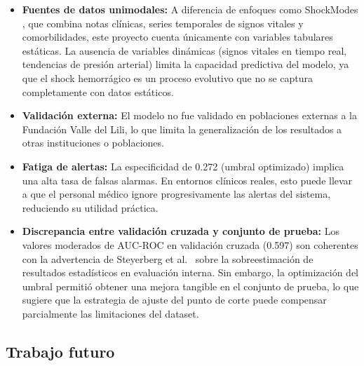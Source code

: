 \documentclass[12pt, letterpaper]{article}
\begin{document}
\begin{itemize}
    \item \textbf{Fuentes de datos unimodales:} A diferencia de enfoques como ShockModes \cite{pal2022}, que combina notas clínicas, series temporales de signos vitales y comorbilidades, este proyecto cuenta únicamente con variables tabulares estáticas. La ausencia de variables dinámicas (signos vitales en tiempo real, tendencias de presión arterial) limita la capacidad predictiva del modelo, ya que el shock hemorrágico es un proceso evolutivo que no se captura completamente con datos estáticos.
    
    \item \textbf{Validación externa:} El modelo no fue validado en poblaciones externas a la Fundación Valle del Lili, lo que limita la generalización de los resultados a otras instituciones o poblaciones.
    
    \item \textbf{Fatiga de alertas:} La especificidad de 0.272 (umbral optimizado) implica una alta tasa de falsas alarmas. En entornos clínicos reales, esto puede llevar a que el personal médico ignore progresivamente las alertas del sistema, reduciendo su utilidad práctica.
    
    \item \textbf{Discrepancia entre validación cruzada y conjunto de prueba:} Los valores moderados de AUC-ROC en validación cruzada (0.597) son coherentes con la advertencia de Steyerberg et al.\ \cite{steyerberg2018} sobre la sobreestimación de resultados estadísticos en evaluación interna. Sin embargo, la optimización del umbral permitió obtener una mejora tangible en el conjunto de prueba, lo que sugiere que la estrategia de ajuste del punto de corte puede compensar parcialmente las limitaciones del dataset.
\end{itemize}

\subsection{Trabajo futuro}
\end{document}
